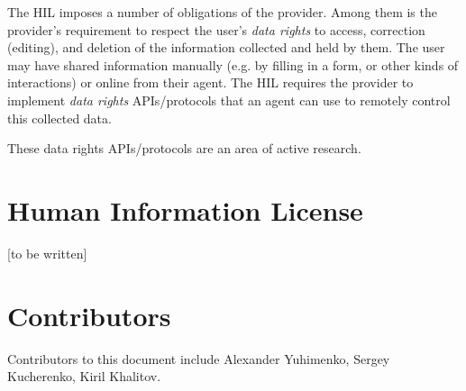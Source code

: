 \documentclass[11pt, oneside]{article}   	%
\begin{document}
The HIL imposes a number of obligations of the provider. Among them is the provider's requirement to respect the user's \emph{data rights} to access, correction (editing), and deletion of the information collected and held by them. The user may have shared information manually (e.g. by filling in a form, or other kinds of interactions) or online from their agent. The HIL requires the provider to implement \emph{data rights} APIs/protocols that an agent can use to remotely control this collected data.

These data rights APIs/protocols are an area of active research.  
    
\section{Human Information License}
[to be written]

\section{Contributors}
Contributors to this document include Alexander Yuhimenko, Sergey Kucherenko, Kiril Khalitov.   



\end{document}
